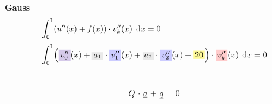 \documentclass[
final,
a4paper,
oneside,
parskip=full,
headings=standardclasses,
headings=big,
pointednumbers,
fleqn
]{scrartcl}
\newcommand{\tfillb}[1]{\tfillc[#1][blue!20]}
\newcommand{\tfilly}[1]{\tfillc[#1][yellow!40]}
\newcommand{\tfillr}[1]{\tfillc[#1][red!20]}
\newcommand{\tfillv}[1]{\tfillc[#1][Violet!20]}
\newcommand{\tfillgr}[1]{\tfillc[#1][Gray!20]}
\newcommand*\difx{\; \mathop{}\!\mathrm{d}x}
\newcommand{\kl}[1]{{\left( #1 \right)}}
\begin{document}
    
    \newpage
    {\bf{Gauss}} \\
    {\setlength{\abovedisplayskip}{-6pt}
    \setlength{\belowdisplayskip}{-12pt}
    \begin{align*}
        \int_{0}^{1}&{\kl{u''\kl{x} + f\kl{x}} \cdot v_k''\kl{x} \difx} = 0  \\[0.1cm]
        \int_{0}^{1}&{\kl{\tfillv{$v_0''$}\kl{x}   + \tfillgr{$a_1$} \cdot \tfillb{$v_1''$}\kl{x}   + \tfillgr{$a_2$} \cdot \tfillb{$v_2''$}\kl{x} + \tfilly{$20$}} \cdot \tfillr{$v_k''$}\kl{x} \difx} = 0  \\[0.1cm]
    \end{align*}} \\
    {\setlength{\abovedisplayskip}{-6pt}
    \setlength{\belowdisplayskip}{-12pt}
    \begin{align*}
        \begin{array}{r@{\ }c@{\ }c@{\ }c@{\ }c@{\ }c@{\ }l}
            Q & \cdot & \uline{a} & + & \uline{q} & = & 0
        \end{array}
    \end{align*}} \\
\end{document}
